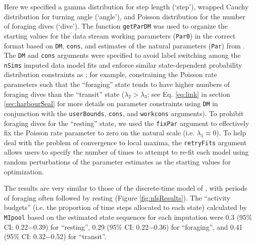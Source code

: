 \documentclass[12pt]{article}\usepackage[]{graphicx}\usepackage[]{color}
\begin{document}
Here we specified a gamma distribution for step length (`step'), wrapped Cauchy distribution for turning angle (`angle'), and Poisson distribution for the number of foraging dives (`dive'). The function \verb|getParDM| was used to organize the starting values for the data stream working parameters (\verb|Par0|) in the correct format based on \verb|DM|, \verb|cons|, and estimates of the natural parameters (\verb|Par|) from \cite{McClintockEtAl2014b}. The \verb|DM| and \verb|cons| arguments were specified to avoid label switching among the \verb|nSims| imputed data model fits and enforce similar state-dependent probability distribution constraints as \cite{McClintockEtAl2014b}; for example, constraining the Poisson rate parameters such that the ``foraging'' state tends to have higher numbers of foraging dives than the ``transit'' state ($\lambda_2 > \lambda_3$; see Eq. \ref{eq:link} in section \ref{sec:harbourSeal} for more details on parameter constraints using \verb|DM| in conjunction with the \verb|userBounds|, \verb|cons|, and \verb|workcons| arguments). To prohibit foraging dives for the ``resting'' state, we used the \verb|fixPar| argument to effectively fix the Poisson rate parameter to zero on the natural scale (i.e. $\lambda_1 \approx 0$).  To help deal with the problem of convergence to local maxima, the \verb|retryFits| argument allows users to specify the number of times to attempt to re-fit each model using random perturbations of the parameter estimates as the starting values for optimization.

The results are very similar to those of the discrete-time model of \cite{McClintockEtAl2014b}, with periods of foraging often followed by resting (Figure \ref{fig:nfsResults}).  The ``activity budgets'' (i.e. the proportion of time steps allocated to each state) calculated by \verb|MIpool| based on the estimated state sequences for each imputation were 0.3 (95\% CI: 0.22$-$0.39) for ``resting'', 0.29 (95\% CI: 0.22$-$0.36) for ``foraging'', and 0.41 (95\% CI: 0.32$-$0.52) for ``transit''.
\end{document}
